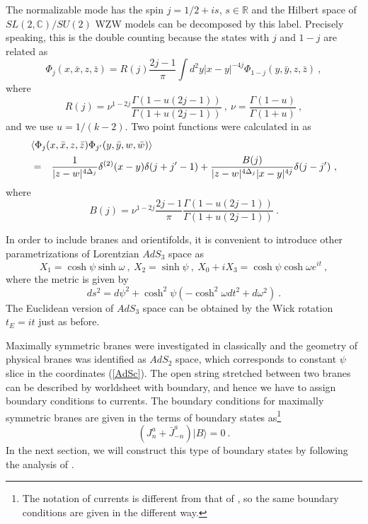 \documentclass[a4paper,12pt]{article}
\newcommand{\br}{\mathbb R}
\newcommand{\bc}{\mathbb C}
\newcommand{\ket}[1]{{|#1\rangle}{}}
\newcommand{\nn}{\nonumber\\}
\begin{document}
The normalizable mode has the spin $j = 1/2 + is$, $s \in \br$ and
the Hilbert space of $SL(2,\bc)/SU(2)$ WZW models can be decomposed by
this label. Precisely speaking, this is the double counting because the
states with $j$ and $1-j$ are related as 
\begin{equation}
 \Phi_j (x, \bar{x}, z, \bar{z}) = 
  R(j) \frac{2 j - 1}{\pi} \int d^2 y | x - y |^{-4j} 
 \Phi_{1-j} (y, \bar{y}, z , \bar{z}) ~,
\label{RR}
\end{equation}
where
\begin{equation}
 R(j) = \nu^{1-2j} \frac{\Gamma (1 - u (2j -1))}{\Gamma (1 + u (2j -1))} 
  ~,~ \nu = \frac{\Gamma (1 - u)}{\Gamma (1+ u)} ~,
\end{equation}
and we use $u = 1 / (k-2)$.
Two point functions were calculated in \cite{Teschner} as
\begin{eqnarray}
 \lefteqn{\langle \Phi_{j} (x, \bar{x}, z , \bar{z})
          \Phi_{j'} (y, \bar{y}, w , \bar{w}) \rangle }\nn
  &=& \frac{1}{|z - w|^{4 \Delta_j} } \delta^{(2)} (x - y) 
    \delta (j + j' -1) 
  + \frac{B(j)}{|z - w|^{4 \Delta_{j}} |x - y |^{4j}}
  \delta (j - j') ~,
\end{eqnarray} 
where
\begin{equation}
 B(j) =\nu^{1-2j}  \frac{2j - 1}{\pi} 
 \frac{\Gamma (1 - u  (2j-1))}{\Gamma (1 + u (2j-1))} ~.
\end{equation}

In order to include branes and orientifolds, 
it is convenient to introduce other parametrizations of Lorentzian
$AdS_3$ space as 
\begin{equation}
 X_1 = \cosh \psi \sinh \omega ~, ~
 X_2 = \sinh \psi ~,~
 X_0 + i X_3 = \cosh \psi \cosh \omega e^{i t} ~,
\label{AdSc}
\end{equation}
where the metric is given by
\begin{equation}
 ds^2 = d \psi ^2 + \cosh ^2 \psi ( - \cosh^2 \omega dt^2 + d \omega ^2)~.
\end{equation}
The Euclidean version of $AdS_3$ space can be obtained by the Wick
rotation $t_E = i t$ just as before. 


Maximally symmetric branes were
investigated in \cite{Stan2,Stan3,BP} classically and the geometry of
physical branes was identified as $AdS_2$ space, which corresponds to 
constant $\psi$ slice in the coordinates (\ref{AdSc}).
The open string stretched between two branes can be described by
worldsheet with boundary, and hence we have to assign boundary
conditions to currents. 
The boundary conditions for maximally symmetric branes are given in the
terms of boundary states
as\footnote{
The notation of currents is different from
that of \cite{HS}, so the same boundary conditions are given in the
different way.
}
\begin{equation}
 (J^a_n + \bar{J}^a_{-n}) \ket{B} = 0 ~.
\label{BS}
\end{equation}
In the next section, we will construct this type of boundary states by
following the analysis of \cite{LOP,PST}.
\end{document}
